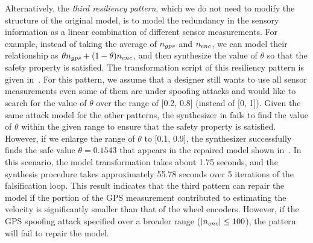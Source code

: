 Alternatively, the \emph{third resiliency pattern}, which we do not need to modify the structure of the original model, is to model the redundancy in the sensory information as a linear combination of different sensor measurements. For example, instead of taking the average of $n_{gps}$ and $n_{enc}$, we can model their relationship as $\theta n_{gps} + (1-\theta)n_{enc}$, and then synthesize the value of $\theta$ so that the safety property is satisfied. The transformation script of this resiliency pattern is given in~. For this pattern, we assume that a designer still wants to use all sensor measurements even some of them are under spoofing attacks and would like to search for the value of $\theta$ over the range of [0.2, 0.8] (instead of [0, 1]). Given the same attack model for the other patterns, the synthesizer in \toolreaffirm fails to find the value of $\theta$ within the given range to ensure that the safety property is satisfied. However, if we enlarge the range of $\theta$ to [0.1, 0.9], the synthesizer successfully finds the safe value $\theta = 0.1543$ that appears in the repaired model shown in~. In this scenario, the model transformation takes about 1.75 seconds, and the synthesis procedure takes approximately 55.78 seconds over 5 iterations of the falsification loop.    
%
This result indicates that the third pattern can repair the model if the portion of the GPS measurement contributed to estimating the velocity is significantly smaller than that of the wheel encoders. However, if the GPS spoofing attack specified over a broader range (\eg $|n_{enc}| \leq 100$), the pattern will fail to repair the model.          









